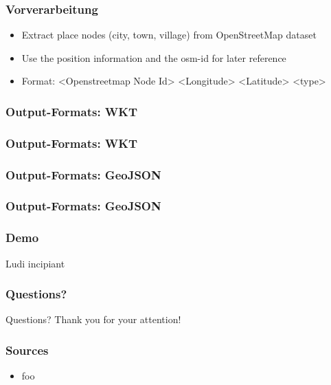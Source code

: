 \documentclass{beamer}
\begin{document}
\begin{frame}
    \frametitle{Vorverarbeitung}
    \begin{itemize}
        \item Extract place nodes (city, town, village) from OpenStreetMap dataset 
        \item Use the position information and the osm-id for later reference
        \item Format: <Openstreetmap Node Id> <Longitude> <Latitude> <type>
    \end{itemize}
\end{frame}

\begin{frame}
    \frametitle{Output-Formats: WKT}
    
\end{frame}

\begin{frame}
    \frametitle{Output-Formats: WKT}
    
\end{frame}

\begin{frame}
    \frametitle{Output-Formats: GeoJSON}
    
\end{frame}

\begin{frame}
    \frametitle{Output-Formats: GeoJSON}
    
\end{frame}

\begin{frame}
    \frametitle{Demo}
    \begin{center}
        Ludi incipiant
    \end{center}
\end{frame}

\begin{frame}
    \frametitle{Questions?}
    \begin{center}
    Questions?
    \newline Thank you for your attention!
    \end{center}
\end{frame}

\begin{frame}
    \frametitle{Sources}
    \begin{itemize}
        \item foo
    \end{itemize}
\end{frame}
\end{document}
